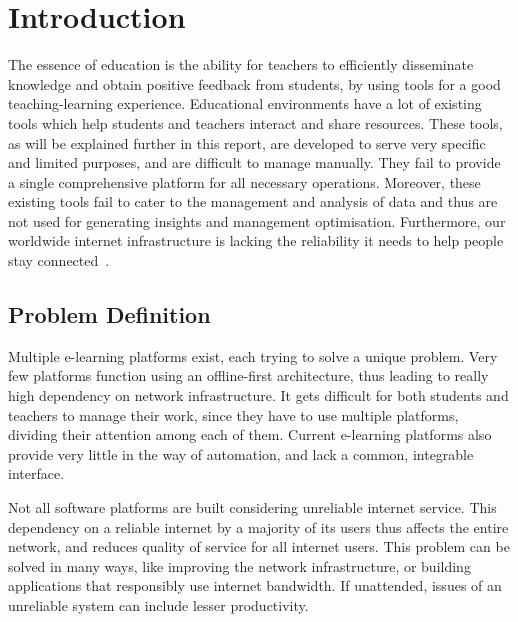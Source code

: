 \chapter{\centering Introduction}

\pagestyle{fancy}
\lhead{}
\rhead{}
\cfoot{}
\rfoot{\thepage}
\renewcommand{\headrulewidth}{2pt}
\renewcommand{\footrulewidth}{0.8pt}


The essence of education is the ability for teachers to efficiently 
disseminate knowledge and obtain positive feedback from students, by 
using tools for a good teaching-learning experience. 
Educational environments have a lot of existing tools which help students 
and teachers interact and share resources. These tools, as will be explained 
further in this report, are developed to serve very specific and limited 
purposes, and are difficult to manage manually. They fail to provide a 
single comprehensive platform for all necessary operations. 
Moreover, these existing tools fail to cater to the management and analysis 
of data and thus are not used for generating insights and management optimisation. 
Furthermore, our worldwide internet infrastructure is lacking the reliability it 
needs to help people stay connected~\cite{WebF20}.

\section{Problem Definition}

Multiple e-learning platforms exist, each trying to solve a unique problem. 
Very few platforms function using an offline-first architecture, thus leading to 
really high dependency on network infrastructure. 
It gets difficult for both students and teachers to manage their work, 
since they have to use multiple platforms, dividing their attention among each of them. 
Current e-learning platforms also provide very little in the way of automation, 
and lack a common, integrable interface.

Not all software platforms are built considering unreliable internet service. 
This dependency on a reliable internet by a majority of its users thus affects the entire network, 
and reduces quality of service for all internet users. This problem can be solved in many ways, 
like improving the network infrastructure, or building applications that 
responsibly use internet bandwidth. If unattended, issues of an unreliable 
system can include lesser productivity.

